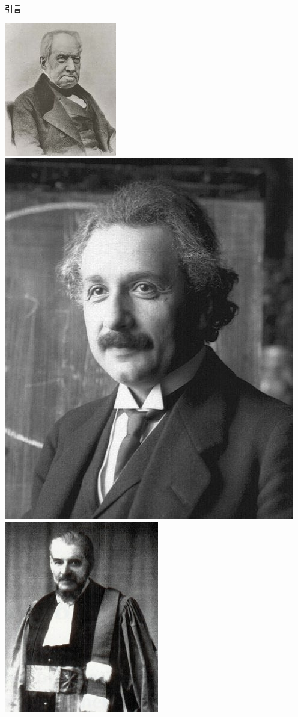 \documentclass[t]{beamer}
\begin{document}
\begin{frame}{引言}
    \begin{center}
      \includegraphics[height=.35\textheight]{fig/brown.jpg} 
\includegraphics[height=.35\textheight]{fig/einstein.jpg}
\includegraphics[height=.35\textheight]{fig/bachelier.jpg}

\end{center}
\end{frame}
\end{document}
